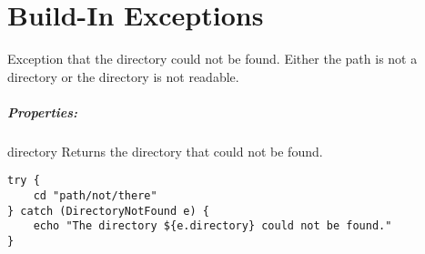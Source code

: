 \section{Build-In Exceptions}

\label{par:directory_not_found}

Exception that the directory could not be found. Either the path is not a
directory or the directory is not readable.

\subparagraph{Properties:}
\begin{asparadesc}
\item[directory] Returns the directory that could not be found.
\end{asparadesc}

\begin{lstlisting}[style=Groovybash, label={lst:example_user_home}]
try {
    cd "path/not/there"
} catch (DirectoryNotFound e) {
    echo "The directory ${e.directory} could not be found."
}
\end{lstlisting}
